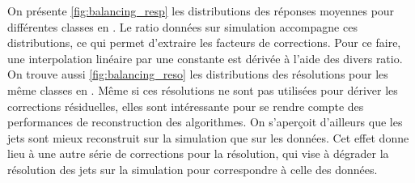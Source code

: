 On présente \cref{fig:balancing_resp} les distributions des réponses moyennes pour différentes classes en \aeta. Le ratio données sur simulation accompagne ces distributions, ce qui permet d'extraire les facteurs de corrections. Pour ce faire, une interpolation linéaire par une constante est dérivée à l'aide des divers ratio. On trouve aussi \cref{fig:balancing_reso} les distributions des résolutions pour les même classes en \aeta. Même si ces résolutions ne sont pas utilisées pour dériver les corrections résiduelles, elles sont intéressante pour se rendre compte des performances de reconstruction des algorithmes. On s'aperçoit d'ailleurs que les jets sont mieux reconstruit sur la simulation que sur les données. Cet effet donne lieu à une autre série de corrections pour la résolution, qui vise à dégrader la résolution des jets sur la simulation pour correspondre à celle des données.

